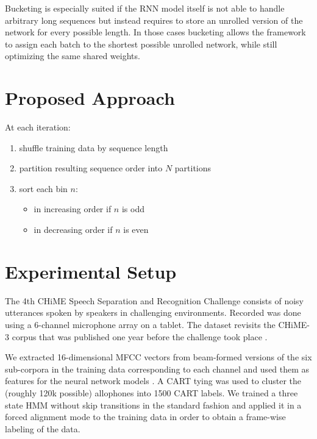 \documentclass{article}
\begin{document}
  Bucketing is especially suited if the RNN model itself is not able to handle arbitrary 
  long sequences but instead requires to store an unrolled version of the network for every possible 
  length. In those cases bucketing allows the framework to assign each batch to the shortest possible 
  unrolled network, while still optimizing the same shared weights.

  \section{Proposed Approach} \label{sec:approach}
 
  At each iteration:
  \begin{enumerate}
  	\item shuffle training data by sequence length
  	\item partition resulting sequence order into $N$ partitions
  	\item sort each bin $n$:
  	\begin{itemize}
  		\item in increasing order if $n$ is odd
  		\item in decreasing order if $n$ is even
  	\end{itemize}
  \end{enumerate}

  \section{Experimental Setup} \label{sec:setup}
  The 4th CHiME Speech Separation and Recognition Challenge
  \cite{Vincent_CSL2016:CHiME4} consists of noisy utterances spoken by speakers in challenging 
  environments. Recorded was done using a 6-channel microphone array on a tablet. The dataset revisits 
  the CHiME-3 corpus that was published one year before the challenge took place \cite{Barker2015:CHiME3}.
  
  We extracted 16-dimensional MFCC vectors from beam-formed versions of the six sub-corpora in the training data corresponding to each channel
  and used them as features for the neural network models \cite{menne16:chime4System}.
  A CART tying was used to cluster the (roughly 120k possible) allophones into 1500 CART labels.
  We trained a three state HMM without skip transitions in the standard fashion and applied it in a forced alignment mode to the training data
  in order to obtain a frame-wise labeling of the data.
\end{document}
